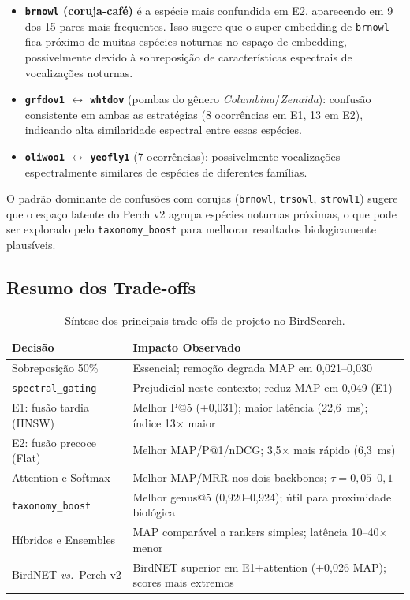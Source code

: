 \documentclass[12pt,a4paper]{article}
\begin{document}
\begin{itemize}
  \item \textbf{\texttt{brnowl} (coruja-café)} é a espécie mais confundida em E2,
  aparecendo em 9 dos 15 pares mais frequentes. Isso sugere que o super-embedding
  de \texttt{brnowl} fica próximo de muitas espécies noturnas no espaço de
  embedding, possivelmente devido à sobreposição de características espectrais
  de vocalizações noturnas.
  \item \textbf{\texttt{grfdov1} $\leftrightarrow$ \texttt{whtdov}} (pombas do gênero
  \textit{Columbina}/\textit{Zenaida}): confusão consistente em ambas as estratégias
  (8 ocorrências em E1, 13 em E2), indicando alta similaridade espectral entre
  essas espécies.
  \item \textbf{\texttt{oliwoo1} $\leftrightarrow$ \texttt{yeofly1}} (7 ocorrências):
  possivelmente vocalizações espectralmente similares de espécies de diferentes
  famílias.
\end{itemize}

O padrão dominante de confusões com corujas (\texttt{brnowl}, \texttt{trsowl},
\texttt{strowl1}) sugere que o espaço latente do Perch v2 agrupa espécies
noturnas próximas, o que pode ser explorado pelo \texttt{taxonomy\_boost} para
melhorar resultados biologicamente plausíveis.

\subsection{Resumo dos Trade-offs}

\begin{table}[htbp]
\centering
\caption{Síntese dos principais trade-offs de projeto no BirdSearch.}
\label{tab:tradeoffs_final}
\begin{tabular}{L{3.8cm}L{7.5cm}}
\toprule
\textbf{Decisão} & \textbf{Impacto Observado} \\
\midrule
Sobreposição 50\% & Essencial; remoção degrada MAP em 0,021--0,030 \\
\texttt{spectral\_gating} & Prejudicial neste contexto; reduz MAP em 0,049 (E1) \\
E1: fusão tardia (HNSW) & Melhor P@5 (+0,031); maior latência (22,6~ms); índice 13$\times$ maior \\
E2: fusão precoce (Flat) & Melhor MAP/P@1/nDCG; 3,5$\times$ mais rápido (6,3~ms) \\
Attention e Softmax & Melhor MAP/MRR nos dois backbones; $\tau=0{,}05$--$0{,}1$ \\
\texttt{taxonomy\_boost} & Melhor genus@5 (0,920--0,924); útil para proximidade biológica \\
Híbridos e Ensembles & MAP comparável a rankers simples; latência 10--40$\times$ menor \\
BirdNET \emph{vs.}\ Perch v2 & BirdNET superior em E1+attention (+0,026 MAP); scores mais extremos \\
\bottomrule
\end{tabular}
\end{table}
\end{document}
